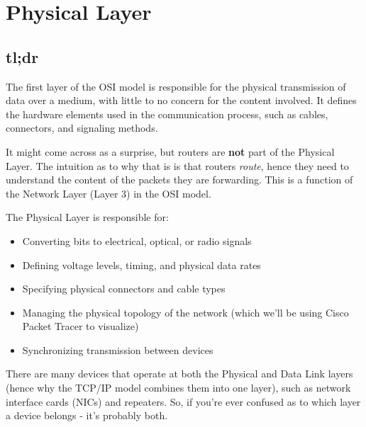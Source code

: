 \chapter{Physical Layer}\label{sec:osi_physical}
\section{tl;dr}
The first layer of the OSI model is responsible for the physical transmission of data over a medium, with little to no concern for the content involved. It defines the hardware elements used in the communication process, such as cables, connectors, and signaling methods. 

\begin{noteblock}
    It might come across as a surprise, but routers are \textbf{not} part of the Physical Layer. The intuition as to why that is is that routers \textit{route}, hence they need to understand the content of the packets they are forwarding. This is a function of the Network Layer (Layer 3) in the OSI model.
\end{noteblock}

The Physical Layer is responsible for:
\begin{itemize}
    \item Converting bits to electrical, optical, or radio signals
    \item Defining voltage levels, timing, and physical data rates
    \item Specifying physical connectors and cable types
    \item Managing the physical topology of the network (which we'll be using Cisco Packet Tracer to visualize)
    \item Synchronizing transmission between devices
\end{itemize}

There are many devices that operate at both the Physical and Data Link layers (hence why the TCP/IP model combines them into one layer), such as network interface cards (NICs) and repeaters. So, if you're ever confused as to which layer a device belongs - it's probably both.
\newpage




